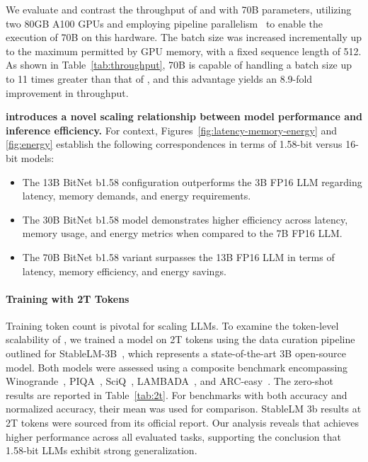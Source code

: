 We evaluate and contrast the throughput of  and  with 70B parameters, utilizing two 80GB A100 GPUs and employing pipeline parallelism~\cite{gpipe} to enable the execution of  70B on this hardware. The batch size was increased incrementally up to the maximum permitted by GPU memory, with a fixed sequence length of 512. As shown in Table~\ref{tab:throughput},  70B is capable of handling a batch size up to 11 times greater than that of , and this advantage yields an 8.9-fold improvement in throughput.

\textbf{ introduces a novel scaling relationship between model performance and inference efficiency.} For context, Figures~\ref{fig:latency-memory-energy} and \ref{fig:energy} establish the following correspondences in terms of 1.58-bit versus 16-bit models:

\begin{itemize}
    \item The 13B BitNet b1.58 configuration outperforms the 3B FP16 LLM regarding latency, memory demands, and energy requirements.
    \item The 30B BitNet b1.58 model demonstrates higher efficiency across latency, memory usage, and energy metrics when compared to the 7B FP16 LLM.
    \item The 70B BitNet b1.58 variant surpasses the 13B FP16 LLM in terms of latency, memory efficiency, and energy savings.
\end{itemize}

\paragraph{Training with 2T Tokens}

Training token count is pivotal for scaling LLMs. To examine the token-level scalability of , we trained a  model on 2T tokens using the data curation pipeline outlined for StableLM-3B~\cite{StableLM-3B-4E1T}, which represents a state-of-the-art 3B open-source model. Both models were assessed using a composite benchmark encompassing Winogrande~\cite{winoGrande}, PIQA~\cite{piqa}, SciQ~\cite{sciq}, LAMBADA~\cite{lambada}, and ARC-easy~\cite{arc}. The zero-shot results are reported in Table~\ref{tab:2t}. For benchmarks with both accuracy and normalized accuracy, their mean was used for comparison. StableLM 3b results at 2T tokens were sourced from its official report. Our analysis reveals that  achieves higher performance across all evaluated tasks, supporting the conclusion that 1.58-bit LLMs exhibit strong generalization.

